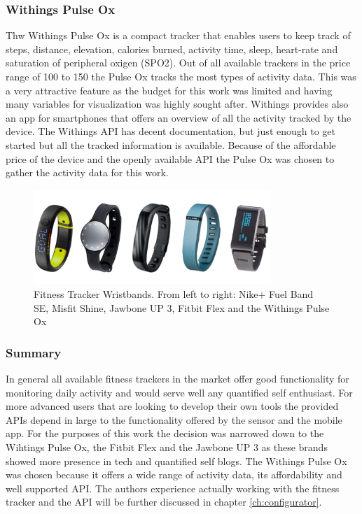 \documentclass[../medieninformatik-arbeit.tex]{subfiles}
\begin{document}
\subsubsection*{Withings Pulse Ox}
Thw Withings Pulse Ox\cite{withingsProduct} is a compact tracker that enables users to keep track of steps, distance, elevation, calories burned, activity time, sleep, heart-rate and saturation of peripheral oxigen (SPO2). Out of all available trackers in the price range of \EUR{}100 to \EUR{}150 the Pulse Ox tracks the most types of activity data. This was a very attractive feature as the budget for this work was limited and having many variables for visualization was highly sought after. Withings provides also an app for smartphones that offers an overview of all the activity tracked by the device. The Withings API\cite{withingsApi} has decent documentation, but just enough to get started but all the tracked information is available. Because of the affordable price of the device and the openly available API the Pulse Ox was chosen to gather the activity data for this work.

\begin{figure}[h]
\captionsetup{width=0.8\textwidth}
\begin{center}
  \includegraphics[width=0.8\textwidth]{RelatedWork/img/bracelets}
  \caption{Fitness Tracker Wristbands. From left to right: Nike+ Fuel Band SE\cite{nikePlusFuelBand}, Misfit Shine\cite{misfitShine}, Jawbone UP 3\cite{jawboneUpProduct}, Fitbit Flex\cite{fitbitProduct} and the Withings Pulse Ox\cite{withingsProduct}}
\label{fig:bracelets}
\end{center}
\end{figure}

\subsubsection*{Summary}
In general all available fitness trackers in the market offer good functionality for monitoring daily activity and would serve well any quantified self enthusiast. For more advanced users that are looking to develop their own tools the provided APIs depend in large to the functionality offered by the sensor and the mobile app. For the purposes of this work the decision was narrowed down to the Wihtings Pulse Ox, the Fitbit Flex and the Jawbone UP 3 as these brands showed more presence in tech and quantified self blogs. The Withings Pulse Ox was chosen because it offers a wide range of activity data, its affordability and well supported API. The authors experience actually working with the fitness tracker and the API will be further discussed in chapter \ref{ch:configurator}.
\end{document}
